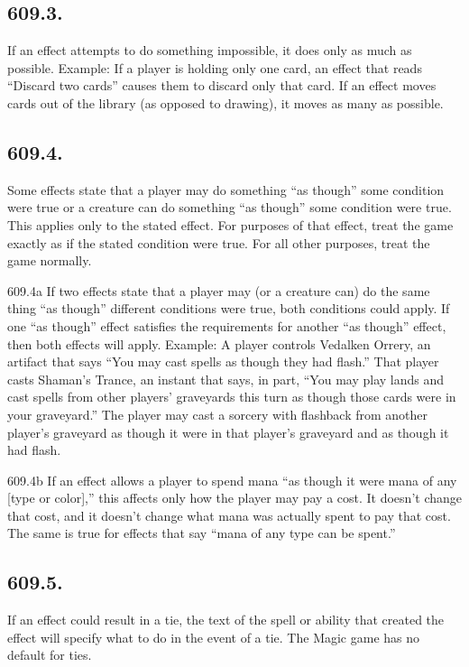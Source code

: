 \subsection*{609.3.}
If an effect attempts to do something impossible, it does only as much as possible.
Example: If a player is holding only one card, an effect that reads “Discard two cards” causes them to discard only that card. If an effect moves cards out of the library (as opposed to drawing), it moves as many as possible.

\subsection*{609.4.}
Some effects state that a player may do something “as though” some condition were true or a creature can do something “as though” some condition were true. This applies only to the stated effect. For purposes of that effect, treat the game exactly as if the stated condition were true. For all other purposes, treat the game normally.

609.4a If two effects state that a player may (or a creature can) do the same thing “as though” different conditions were true, both conditions could apply. If one “as though” effect satisfies the requirements for another “as though” effect, then both effects will apply.
Example: A player controls Vedalken Orrery, an artifact that says “You may cast spells as though they had flash.” That player casts Shaman’s Trance, an instant that says, in part, “You may play lands and cast spells from other players’ graveyards this turn as though those cards were in your graveyard.” The player may cast a sorcery with flashback from another player’s graveyard as though it were in that player’s graveyard and as though it had flash.

609.4b If an effect allows a player to spend mana “as though it were mana of any [type or color],” this affects only how the player may pay a cost. It doesn’t change that cost, and it doesn’t change what mana was actually spent to pay that cost. The same is true for effects that say “mana of any type can be spent.”

\subsection*{609.5.}
If an effect could result in a tie, the text of the spell or ability that created the effect will specify what to do in the event of a tie. The Magic game has no default for ties.


